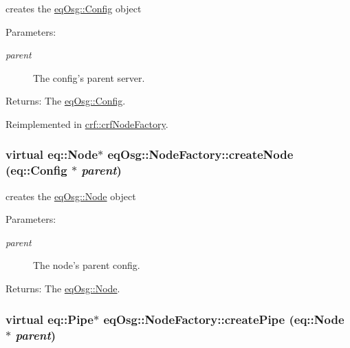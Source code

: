 creates the \hyperlink{a00003}{eqOsg::Config} object 

\begin{Desc}
\item[Parameters:]
\begin{description}
\item[{\em parent}]The config's parent server. \end{description}
\end{Desc}
\begin{Desc}
\item[Returns:]The \hyperlink{a00003}{eqOsg::Config}. \end{Desc}


Reimplemented in \hyperlink{a00005_0b7b562ae3d0ccc5a98017195926057f}{crf::crfNodeFactory}.\hypertarget{a00013_9a411368eca08325cdc5f80ea687f217}{
\subsubsection[{createNode}]{\setlength{\rightskip}{0pt plus 5cm}virtual eq::Node$\ast$ eqOsg::NodeFactory::createNode (eq::Config $\ast$ {\em parent})}}
\label{a00013_9a411368eca08325cdc5f80ea687f217}


creates the \hyperlink{a00012}{eqOsg::Node} object 

\begin{Desc}
\item[Parameters:]
\begin{description}
\item[{\em parent}]The node's parent config. \end{description}
\end{Desc}
\begin{Desc}
\item[Returns:]The \hyperlink{a00012}{eqOsg::Node}. \end{Desc}
\hypertarget{a00013_10e06f5d0d32f146994274682d39e666}{
\subsubsection[{createPipe}]{\setlength{\rightskip}{0pt plus 5cm}virtual eq::Pipe$\ast$ eqOsg::NodeFactory::createPipe (eq::Node $\ast$ {\em parent})}}
\label{a00013_10e06f5d0d32f146994274682d39e666}



